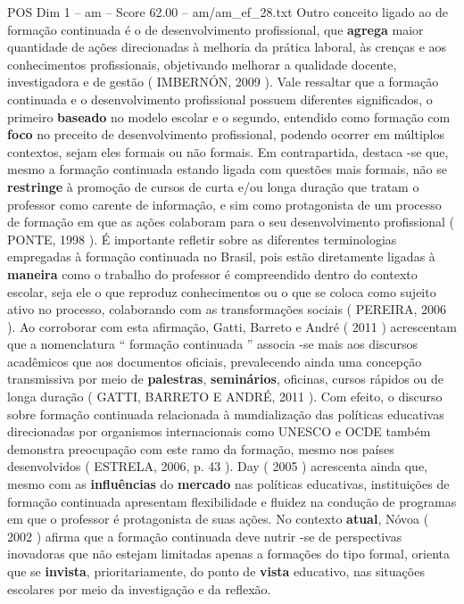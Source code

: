 \begin{textsample}{POS Dim 1 – am – Score 62.00 – am/am\_ef\_28.txt}
Outro conceito ligado ao de formação continuada é o de desenvolvimento profissional, que \textbf{agrega} maior quantidade de ações direcionadas à melhoria da prática laboral, às crenças e aos conhecimentos profissionais, objetivando melhorar a qualidade docente, investigadora e de gestão ( IMBERNÓN, 2009 ).
Vale ressaltar que a formação continuada e o desenvolvimento profissional possuem diferentes significados, o primeiro \textbf{baseado} no modelo escolar e o segundo, entendido como formação com \textbf{foco} no preceito de desenvolvimento profissional, podendo ocorrer em múltiplos contextos, sejam eles formais ou não formais.
Em contrapartida, destaca -se que, mesmo a formação continuada estando ligada com questões mais formais, não se \textbf{restringe} à promoção de cursos de curta e/ou longa duração que tratam o professor como carente de informação, e sim como protagonista de um processo de formação em que as ações colaboram para o seu desenvolvimento profissional ( PONTE, 1998 ).
É importante refletir sobre as diferentes terminologias empregadas à formação continuada no Brasil, pois estão diretamente ligadas à \textbf{maneira} como o trabalho do professor é compreendido dentro do contexto escolar, seja ele o que reproduz conhecimentos ou o que se coloca como sujeito ativo no processo, colaborando com as transformações sociais ( PEREIRA, 2006 ).
Ao corroborar com esta afirmação, Gatti, Barreto e André ( 2011 ) acrescentam que a nomenclatura “ formação continuada ” associa -se mais aos discursos acadêmicos que aos documentos oficiais, prevalecendo ainda uma concepção transmissiva por meio de \textbf{palestras}, \textbf{seminários}, oficinas, cursos rápidos ou de longa duração ( GATTI, BARRETO E ANDRÉ, 2011 ).
Com efeito, o discurso sobre formação continuada relacionada à mundialização das políticas educativas direcionadas por organismos internacionais como UNESCO e OCDE também demonstra preocupação com este ramo da formação, mesmo nos países desenvolvidos ( ESTRELA, 2006, p. 43 ).
Day ( 2005 ) acrescenta ainda que, mesmo com as \textbf{influências} do \textbf{mercado} nas políticas educativas, instituições de formação continuada apresentam flexibilidade e fluidez na condução de programas em que o professor é protagonista de suas ações.
No contexto \textbf{atual}, Nóvoa ( 2002 ) afirma que a formação continuada deve nutrir -se de perspectivas inovadoras que não estejam limitadas apenas a formações do tipo formal, orienta que se \textbf{invista}, prioritariamente, do ponto de \textbf{vista} educativo, nas situações escolares por meio da investigação e da reflexão.

\end{textsample}
